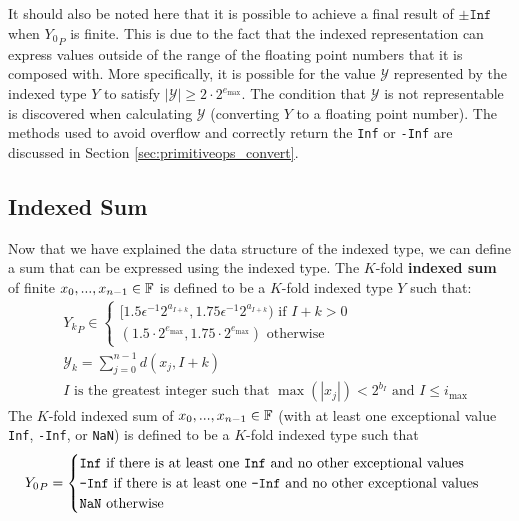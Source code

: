       It should also be noted here that it is possible to achieve a final result of
      $\pm \texttt{Inf}$ when ${Y_0}_P$ is finite. This is due to
      the fact that the indexed representation can express values outside of
      the range of the floating point numbers that it is composed with. More
      specifically, it is possible for the value $\mathcal{Y}$ represented by
      the indexed type $Y$ to satisfy $|\mathcal{Y}| \geq 2 \cdot
      2^{e_{\max}}$. The condition that $\mathcal{Y}$ is not representable is
      discovered when calculating $\mathcal{Y}$ (converting $Y$ to a floating
      point number). The methods used to avoid overflow and correctly return
      the \texttt{Inf} or \texttt{-Inf} are discussed in Section
      \ref{sec:primitiveops_convert}.

    \subsection{Indexed Sum}
      \label{sec:indexed_sum}
      Now that we have explained the data structure of the indexed type, we can define a sum that can be expressed using the indexed type. The $K$-fold \textbf{indexed sum} of finite $x_0, ..., x_{n - 1} \in \mathbb{F}$ is defined to be a $K$-fold indexed type $Y$ such that:
      \begin{align}
        &{Y_k}_P \in \begin{cases}[1.5  \epsilon^{-1} 2^{a_{I + k}}, 1.75  \epsilon^{-1} 2^{a_{I + k}}) \text{ if } I + k > 0 \\ (1.5 \cdot 2^{e_{\max}}, 1.75 \cdot 2^{e_{\max}}) \text{ otherwise}\end{cases} \nonumber\\
        &\mathcal{Y}_k = \sum\limits_{j = 0}^{n - 1}d(x_j, I + k)\nonumber\\
        & I\text{ is the greatest integer such that }\max(|x_j|) < 2^{b_I} \text{ and } I \leq i_{\max}\label{eq:indexed_sum}
      \end{align}
      The $K$-fold indexed sum of $x_0, ..., x_{n - 1} \in \mathbb{F}$ (with at least one exceptional value \texttt{Inf}, \texttt{-Inf}, or \texttt{NaN}) is defined to be a $K$-fold indexed type such that
      \begin{equation}
        {Y_0}_P = \begin{cases}\texttt{Inf} \text{ if there is at least one \texttt{Inf} and no other exceptional values}\\ \texttt{-Inf} \text{ if there is at least one \texttt{-Inf} and no other exceptional values}\\ \texttt{NaN}\text{ otherwise}\end{cases} \label{eq:indexed_sum_exceptional}
      \end{equation}
